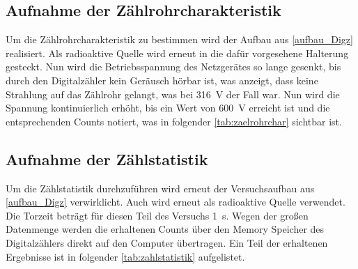 \documentclass[12pt,english,ngerman]{scrartcl}
\begin{document}
\subsection{Aufnahme der Zählrohrcharakteristik}

Um die Zählrohrcharakteristik zu bestimmen wird der Aufbau aus
\autoref{aufbau_Digz} realisiert. Als radioaktive Quelle wird erneut
 in die dafür vorgesehene Halterung gesteckt. Nun wird die
Betriebsspannung des Netzgerätes so lange gesenkt, bis durch den Digitalzähler
kein Geräusch hörbar ist, was anzeigt, dass keine Strahlung auf das Zählrohr
gelangt, was bei \SI{316}{\volt} der Fall war. Nun wird die Spannung
kontinuierlich erhöht, bis ein Wert von \SI{600}{\volt} erreicht ist und die
entsprechenden Counts notiert, was in folgender \autoref{tab:zaelrohrchar}
sichtbar ist.

\begin{table}[H]
	\caption[Erhaltene Zählraten für die Zählrohrcharakteristik]{
		Erhaltene Zählraten für die Zählrohrcharakteristik
		bei einer Torzeit von \SI{10}{\second} und einem
		Abstand der radioaktiven Quelle von \SI{15(2)}{\mm}. Zählraten sind exakt. \\
		\(U \dots\) eingestellte Betriebsspannung in \si{\volt} mit einer Unsicherheit von \SI{2}{\volt} \\
		\(z_{i} \dots\) erhaltene Zählrate bei der entsprechenden Betriebsspannung}
	\label{tab:zaelrohrchar}
	\begin{center}
		
	\end{center}
\end{table}

\subsection{Aufnahme der Zählstatistik}

Um die Zählstatistik durchzuführen wird erneut der Versuchsaufbau aus
\autoref{aufbau_Digz} verwirklicht. Auch wird erneut  als
radioaktive Quelle verwendet. Die Torzeit beträgt für diesen Teil des Versuchs
\SI{1}{\second}. Wegen der großen Datenmenge werden die erhaltenen Counts über
den Memory Speicher des Digitalzählers direkt auf den Computer übertragen. Ein
Teil der erhaltenen Ergebnisse ist in folgender \autoref{tab:zahlstatistik}
aufgelistet.
\end{document}
